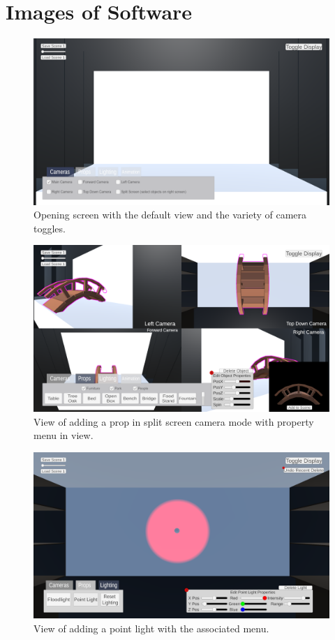 \documentclass[10pt,twocolumn]{article}
\begin{document}
\section{Images of Software}
\begin{figure}[t]
    \includegraphics[width=.75\linewidth]{blankcameras.png}
\centering    
\caption{
        Opening screen with the default view and the variety of camera toggles.
    }
    \label{fig:Fig1}
\end{figure}

\begin{figure}
    \includegraphics[width=.75\linewidth]{addbridge.png}
\centering
    \caption{
        View of adding a prop in split screen camera mode with property menu in view. 
    }
    \label{fig:Fig2}
\end{figure}

\begin{figure}
    \includegraphics[width=.75\linewidth]{addlight.png}
\centering
    \caption{
        View of adding a point light with the associated menu.
    }
    \label{fig:Fig3}
\end{figure}
\end{document}
